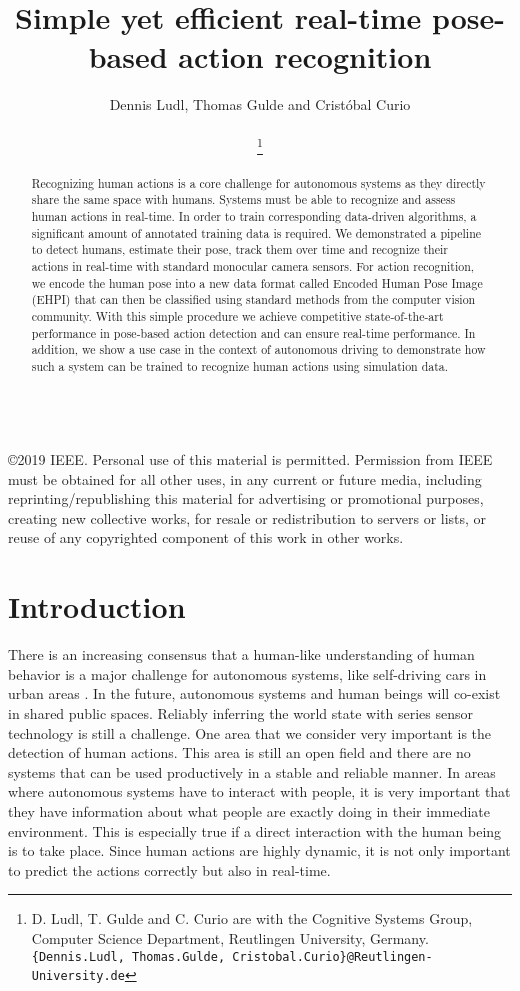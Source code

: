 \documentclass[a4paper, 10pt, conference]{ieeeconf}
\title{\LARGE \bf
Simple yet efficient real-time pose-based action recognition
}
\author{Dennis Ludl, Thomas Gulde and Crist\'obal Curio\\
	\scriptsize \\
\thanks{D. Ludl, T. Gulde and C. Curio are with the Cognitive Systems Group, Computer Science Department, Reutlingen University, Germany.
{\tt\small \{Dennis.Ludl, Thomas.Gulde, Cristobal.Curio\}@Reutlingen-University.de}
}}
\begin{document}
\begin{minipage}{\textwidth}\ \\[14pt] \centering
  \copyright 2019 IEEE. Personal use of this material is permitted.  Permission from IEEE must be obtained for all other uses, in any current or future media, including reprinting/republishing this material for advertising or promotional purposes, creating new collective works, for resale or redistribution to servers or lists, or reuse of any copyrighted component of this work in other works.
\end{minipage}

\newpage

\maketitle

\thispagestyle{empty}
\pagestyle{empty}


\begin{abstract}
Recognizing human actions is a core challenge for autonomous systems as they directly share the same space with humans. Systems must be able to recognize and assess human actions in real-time. In order to train corresponding data-driven algorithms, a significant amount of annotated training data is required. We demonstrated a pipeline to detect humans, estimate their pose, track them over time and recognize their actions in real-time with standard monocular camera sensors. For action recognition, we encode the human pose into a new data format called Encoded Human Pose Image (EHPI) that can then be classified using standard methods from the computer vision community. With this simple procedure we achieve competitive state-of-the-art performance in pose-based action detection and can ensure real-time performance. In addition, we show a use case in the context of autonomous driving to demonstrate how such a system can be trained to recognize human actions using simulation data.
\end{abstract}

\section{Introduction}
There is an increasing consensus that a human-like understanding of human behavior is a major challenge for autonomous systems, like self-driving cars in urban areas \cite{brooksBigProblemSelfDriving2017}. In the future, autonomous systems and human beings will co-exist in shared public spaces. Reliably inferring the world state with series sensor technology is still a challenge. One area that we consider very important is the detection of human actions. This area is still an open field and there are no systems that can be used productively in a stable and reliable manner. In areas where autonomous systems have to interact with people, it is very important that they have information about what people are exactly doing in their immediate environment. This is especially true if a direct interaction with the human being is to take place. Since human actions are highly dynamic, it is not only important to predict the actions correctly but also in real-time.
\end{document}
